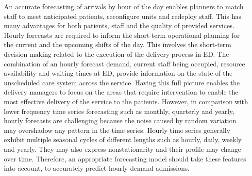 \documentclass[]{elsarticle} %
\begin{document}
An accurate forecasting of arrivals by hour of the day enables planners to match staff to meet anticipated patients, reconfigure units and redeploy staff. This has many advantages for both patients, staff and the quality of provided services. Hourly forecasts are required to inform the short-term operational planning for the current and the upcoming shifts of the day. This involves the short-term decision making related to the execution of the delivery process in ED.
The combination of an hourly forecast demand, current staff being occupied, resource availability and waiting times at ED, provide information on the state of the unscheduled care system across the service. Having this full picture enables the delivery managers to focus on the areas that require intervention to enable the most effective delivery of the service to the patients. However, in comparison with lower frequency time series forecasting such as monthly, quarterly and yearly, hourly forecasts are challenging because the noise caused by random variation may overshadow any pattern in the time series. Hourly time series generally exhibit multiple seasonal cycles of different lengths such as hourly, daily, weekly and yearly. They may also express nonstationarity and their profile may change over time. Therefore, an appropriate forecasting model should take these features into account, to accurately predict hourly demand admissions.
\end{document}

